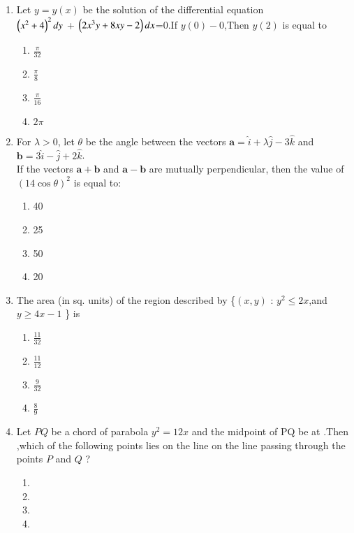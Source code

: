 \documentclass[journal,12pt,onecolumn]{IEEEtran}
\theoremstyle{remark}
\begin{document}
\begin{enumerate}
\item Let $y=y(x)$ be the solution of the differential equation \\
$\left(x^2+4\right)^2dy$ + $\left(2x^3y+8xy-2\right)dx$=0.If $y(0)-0$,Then $y(2)$ is equal to 
\begin{enumerate}
\item $\frac{\pi}{32}$
\item $\frac{\pi}{8}$
\item $\frac{\pi}{16}$
\item $2\pi$
\end{enumerate}
\item For $\lambda > 0$, let $\theta$ be the angle between the vectors $\mathbf{a} = \hat{i} + \lambda \hat{j} - 3 \hat{k}$ and $\mathbf{b} = 3 \hat{i} - \hat{j} + 2 \hat{k}$. \\
If the vectors $\mathbf{a} + \mathbf{b}$ and $\mathbf{a} - \mathbf{b}$ are mutually perpendicular, then the value of $(14 \cos \theta)^2$ is equal to: \\
\begin{enumerate}
\item 40
\item 25
\item 50
\item 20
\end{enumerate}
\item The area (in sq. units) of the region described by \{$(x, y)$ : $y^2 \leq 2x$,and $y \geq 4x - 1$ \} is


\begin{enumerate}
\item $\frac{11}{32}$
\item $\frac{11}{12}$
\item $\frac{9}{32}$
\item $\frac{8}{9}$
\end{enumerate}
\item Let $PQ$ be a chord of parabola $y^2=12x$ and the midpoint of PQ be at .Then ,which of the following points lies on the line on the line passing through the points $P$ and $Q$ ?
\begin{enumerate}
\item {}
\item {}
\item {}
\item {}
\end{enumerate}

\end{enumerate}
\end{document}
